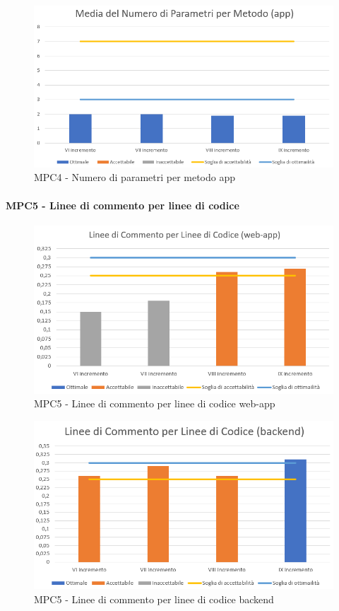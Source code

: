   \begin{figure}[h!]
    \centering
      \includegraphics[scale=0.8]{Immagini/MediaNumPar APPA.PNG}
    \caption{MPC4 - Numero di parametri per metodo app}
  \end{figure}


  \clearpage
  \paragraph{MPC5 - Linee di commento per linee di codice}
  \begin{figure}[h!]
    \centering
      \includegraphics[scale=1]{Immagini/lineeCommLineeCod WAA.PNG}
    \caption{MPC5 - Linee di commento per linee di codice web-app}
  \end{figure}

  \begin{figure}[h!]
    \centering
      \includegraphics[scale=1]{Immagini/lineeCommLineeCod BEA.PNG}
    \caption{MPC5 - Linee di commento per linee di codice backend}
  \end{figure}

